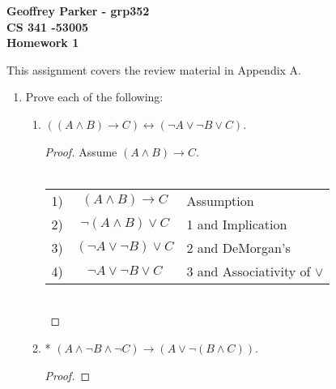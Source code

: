 \documentclass[10pt]{article}
\begin{document}
\begin{flushleft}
\textbf{Geoffrey Parker - grp352 \\
CS 341 -53005 \\
Homework 1}
\end{flushleft}
This assignment covers the review material in Appendix A.
\begin{enumerate}


\item
Prove each of the following:
\begin{enumerate}
\item
$((A \land B) \rightarrow C) \leftrightarrow (\lnot A \lor \lnot B \lor C)$. \\
\begin{proof}
Assume $(A \land B) \rightarrow C$. \\ \\
\begin{tabular}{r c l}
1) & $(A \land B) \rightarrow C$ & Assumption \\
2) & $\lnot (A \land B) \lor C$ & 1 and Implication \\
3) & $(\lnot A \lor \lnot B) \lor C$ & 2 and DeMorgan's \\
4) & $\lnot A \lor \lnot B \lor C$  & 3 and Associativity of $\lor$
\end{tabular} \\
\end{proof}
\item
* $(A \land \lnot B \land \lnot C) \rightarrow (A \lor \lnot (B \land C))$.
\begin{proof}
\end{proof}
\end{enumerate}




\end{enumerate}
\end{document}
